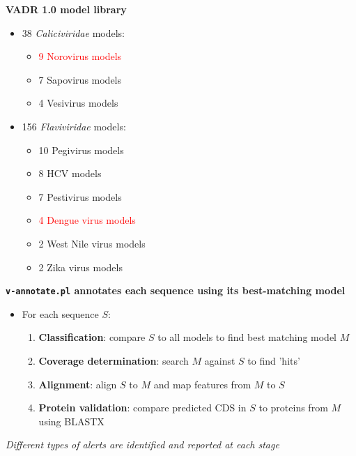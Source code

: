 \documentclass[landscape]{slides}
\begin{document}
\begin{slide}
\begin{center}
\normalsize
\textbf{VADR 1.0 model library}


\small
\begin{itemize}
\item 38 \emph{Caliciviridae} models:
  \begin{itemize}
  \item \textcolor{red}{9 Norovirus models}
  \item 7 Sapovirus models
  \item 4 Vesivirus models
  \end{itemize}
\item 156 \emph{Flaviviridae} models:
  \begin{itemize}
  \item 10 Pegivirus models
  \item 8 HCV models
  \item 7 Pestivirus models
  \item \textcolor{red}{4 Dengue virus models}
  \item 2 West Nile virus models
  \item 2 Zika virus models
  \end{itemize}
\end{itemize}

\end{center}

\vfill
\end{slide}
\begin{slide}
\begin{center}
\textbf{\texttt{v-annotate.pl} annotates each sequence using its
  best-matching model}

\begin{itemize}
\item For each sequence $S$:
\small
\begin{enumerate}
\item \textbf{Classification}: compare $S$ to all models to find best matching model $M$
\item \textbf{Coverage determination}: search $M$ against $S$ to find 'hits'
\item \textbf{Alignment}: align $S$ to $M$ and map features from $M$ to $S$
\item \textbf{Protein validation}: compare predicted CDS in $S$ to proteins
  from $M$ using BLASTX
\end{enumerate}
\end{itemize}

\emph{Different types of alerts are identified and reported at each stage}

\end{center}

\vfill
\end{slide}
\end{document}
